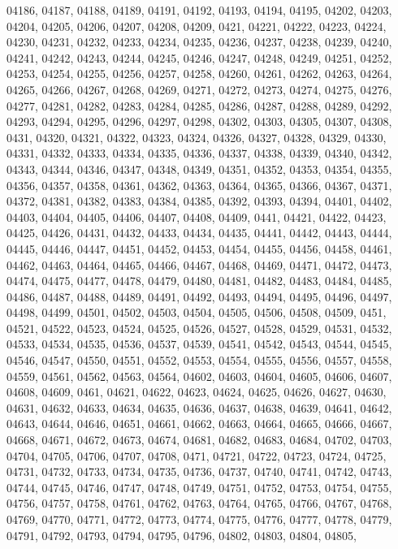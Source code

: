 {04186,
04187,
04188,
04189,
04191,
04192,
04193,
04194,
04195,
04202,
04203,
04204,
04205,
04206,
04207,
04208,
04209,
0421,
04221,
04222,
04223,
04224,
04230,
04231,
04232,
04233,
04234,
04235,
04236,
04237,
04238,
04239,
04240,
04241,
04242,
04243,
04244,
04245,
04246,
04247,
04248,
04249,
04251,
04252,
04253,
04254,
04255,
04256,
04257,
04258,
04260,
04261,
04262,
04263,
04264,
04265,
04266,
04267,
04268,
04269,
04271,
04272,
04273,
04274,
04275,
04276,
04277,
04281,
04282,
04283,
04284,
04285,
04286,
04287,
04288,
04289,
04292,
04293,
04294,
04295,
04296,
04297,
04298,
04302,
04303,
04305,
04307,
04308,
0431,
04320,
04321,
04322,
04323,
04324,
04326,
04327,
04328,
04329,
04330,
04331,
04332,
04333,
04334,
04335,
04336,
04337,
04338,
04339,
04340,
04342,
04343,
04344,
04346,
04347,
04348,
04349,
04351,
04352,
04353,
04354,
04355,
04356,
04357,
04358,
04361,
04362,
04363,
04364,
04365,
04366,
04367,
04371,
04372,
04381,
04382,
04383,
04384,
04385,
04392,
04393,
04394,
04401,
04402,
04403,
04404,
04405,
04406,
04407,
04408,
04409,
0441,
04421,
04422,
04423,
04425,
04426,
04431,
04432,
04433,
04434,
04435,
04441,
04442,
04443,
04444,
04445,
04446,
04447,
04451,
04452,
04453,
04454,
04455,
04456,
04458,
04461,
04462,
04463,
04464,
04465,
04466,
04467,
04468,
04469,
04471,
04472,
04473,
04474,
04475,
04477,
04478,
04479,
04480,
04481,
04482,
04483,
04484,
04485,
04486,
04487,
04488,
04489,
04491,
04492,
04493,
04494,
04495,
04496,
04497,
04498,
04499,
04501,
04502,
04503,
04504,
04505,
04506,
04508,
04509,
0451,
04521,
04522,
04523,
04524,
04525,
04526,
04527,
04528,
04529,
04531,
04532,
04533,
04534,
04535,
04536,
04537,
04539,
04541,
04542,
04543,
04544,
04545,
04546,
04547,
04550,
04551,
04552,
04553,
04554,
04555,
04556,
04557,
04558,
04559,
04561,
04562,
04563,
04564,
04602,
04603,
04604,
04605,
04606,
04607,
04608,
04609,
0461,
04621,
04622,
04623,
04624,
04625,
04626,
04627,
04630,
04631,
04632,
04633,
04634,
04635,
04636,
04637,
04638,
04639,
04641,
04642,
04643,
04644,
04646,
04651,
04661,
04662,
04663,
04664,
04665,
04666,
04667,
04668,
04671,
04672,
04673,
04674,
04681,
04682,
04683,
04684,
04702,
04703,
04704,
04705,
04706,
04707,
04708,
0471,
04721,
04722,
04723,
04724,
04725,
04731,
04732,
04733,
04734,
04735,
04736,
04737,
04740,
04741,
04742,
04743,
04744,
04745,
04746,
04747,
04748,
04749,
04751,
04752,
04753,
04754,
04755,
04756,
04757,
04758,
04761,
04762,
04763,
04764,
04765,
04766,
04767,
04768,
04769,
04770,
04771,
04772,
04773,
04774,
04775,
04776,
04777,
04778,
04779,
04791,
04792,
04793,
04794,
04795,
04796,
04802,
04803,
04804,
04805,
}
